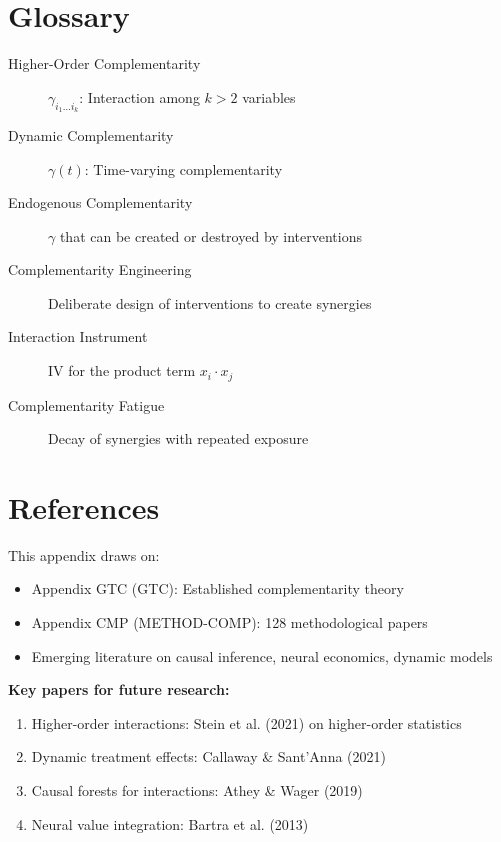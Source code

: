 \section{Glossary}
\label{sec:glossary}

\begin{description}
    \item[Higher-Order Complementarity] $\gamma_{i_1 \ldots i_k}$: Interaction among $k > 2$ variables
    \item[Dynamic Complementarity] $\gamma(t)$: Time-varying complementarity
    \item[Endogenous Complementarity] $\gamma$ that can be created or destroyed by interventions
    \item[Complementarity Engineering] Deliberate design of interventions to create synergies
    \item[Interaction Instrument] IV for the product term $x_i \cdot x_j$
    \item[Complementarity Fatigue] Decay of synergies with repeated exposure
\end{description}

\section{References}
\label{sec:references}

\nocite{bcm_master}

This appendix draws on:
\begin{itemize}[noitemsep]
    \item Appendix GTC (GTC): Established complementarity theory
    \item Appendix CMP (METHOD-COMP): 128 methodological papers
    \item Emerging literature on causal inference, neural economics, dynamic models
\end{itemize}

\textbf{Key papers for future research:}
\begin{enumerate}
    \item Higher-order interactions: Stein et al. (2021) on higher-order statistics
    \item Dynamic treatment effects: Callaway \& Sant'Anna (2021)
    \item Causal forests for interactions: Athey \& Wager (2019)
    \item Neural value integration: Bartra et al. (2013)
\end{enumerate}

